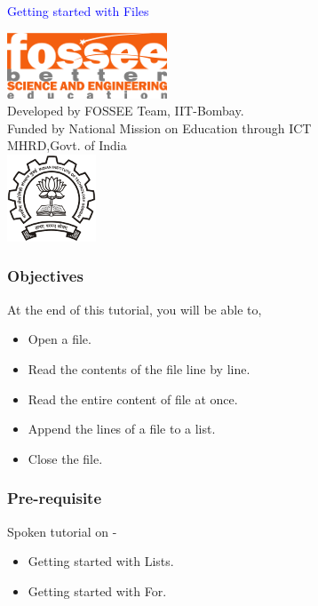 \documentclass[presentation]{beamer}
\title{}
\author{FOSSEE}
\date{}
\begin{document}
\begin{frame}

\begin{center}
\vspace{12pt}
\textcolor{blue}{\huge Getting started with Files}
\end{center}
\vspace{18pt}
\begin{center}
\vspace{10pt}
\includegraphics[scale=0.95]{../images/fossee-logo.png}\\
\vspace{5pt}
\scriptsize Developed by FOSSEE Team, IIT-Bombay. \\ 
\scriptsize Funded by National Mission on Education through ICT\\
\scriptsize  MHRD,Govt. of India\\
\includegraphics[scale=0.30]{../images/iitb-logo.png}\\
\end{center}
\end{frame}
\begin{frame}
\frametitle{Objectives}
\label{sec-2}

  At the end of this tutorial, you will be able to, 

\begin{itemize}
\item Open a file.
\item Read the contents of the file line by line.
\item Read the entire content of file at once.
\item Append the lines of a file to a list.
\item Close the file.
\end{itemize}
\end{frame}
\begin{frame}
\frametitle{Pre-requisite}
\label{sec-3}

  Spoken tutorial on -

\begin{itemize}
\item Getting started with Lists.
\item Getting started with For.
\end{itemize}
\end{frame}
\end{document}

